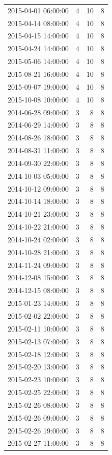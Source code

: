 \begin{tabular}{lrrr}
2015-04-01 06:00:00 & 4 & 10 & 8 \\
2015-04-14 08:00:00 & 4 & 10 & 8 \\
2015-04-15 14:00:00 & 4 & 10 & 8 \\
2015-04-24 14:00:00 & 4 & 10 & 8 \\
2015-05-06 14:00:00 & 4 & 10 & 8 \\
2015-08-21 16:00:00 & 4 & 10 & 8 \\
2015-09-07 19:00:00 & 4 & 10 & 8 \\
2015-10-08 10:00:00 & 4 & 10 & 8 \\
2014-06-28 09:00:00 & 3 & 8 & 8 \\
2014-06-29 14:00:00 & 3 & 8 & 8 \\
2014-08-26 18:00:00 & 3 & 8 & 8 \\
2014-08-31 11:00:00 & 3 & 8 & 8 \\
2014-09-30 22:00:00 & 3 & 8 & 8 \\
2014-10-03 05:00:00 & 3 & 8 & 8 \\
2014-10-12 09:00:00 & 3 & 8 & 8 \\
2014-10-14 18:00:00 & 3 & 8 & 8 \\
2014-10-21 23:00:00 & 3 & 8 & 8 \\
2014-10-22 21:00:00 & 3 & 8 & 8 \\
2014-10-24 02:00:00 & 3 & 8 & 8 \\
2014-10-28 21:00:00 & 3 & 8 & 8 \\
2014-11-24 09:00:00 & 3 & 8 & 8 \\
2014-12-08 15:00:00 & 3 & 8 & 8 \\
2014-12-15 08:00:00 & 3 & 8 & 8 \\
2015-01-23 14:00:00 & 3 & 8 & 8 \\
2015-02-02 22:00:00 & 3 & 8 & 8 \\
2015-02-11 10:00:00 & 3 & 8 & 8 \\
2015-02-13 07:00:00 & 3 & 8 & 8 \\
2015-02-18 12:00:00 & 3 & 8 & 8 \\
2015-02-20 13:00:00 & 3 & 8 & 8 \\
2015-02-23 10:00:00 & 3 & 8 & 8 \\
2015-02-25 22:00:00 & 3 & 8 & 8 \\
2015-02-26 08:00:00 & 3 & 8 & 8 \\
2015-02-26 09:00:00 & 3 & 8 & 8 \\
2015-02-26 19:00:00 & 3 & 8 & 8 \\
2015-02-27 11:00:00 & 3 & 8 & 8 \\

\end{tabular}
